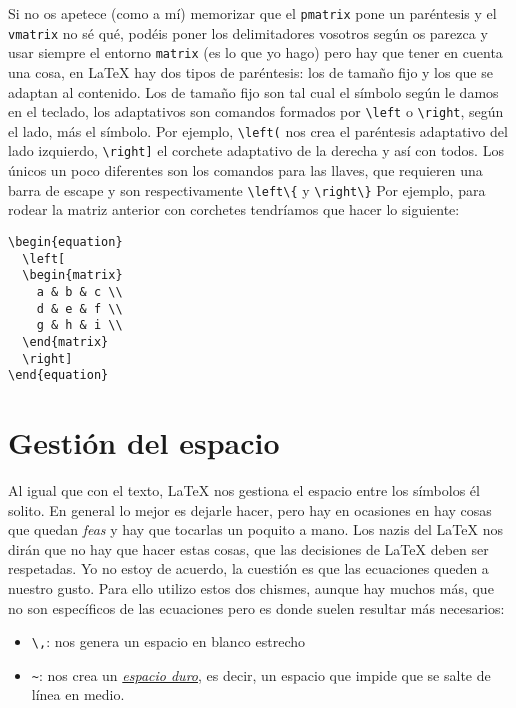 Si no os apetece (como a mí) memorizar que el \lstinline!pmatrix! pone
un paréntesis y el \lstinline!vmatrix! no sé qué, podéis poner los
delimitadores vosotros según os parezca y usar siempre el entorno
\lstinline!matrix! (es lo que yo hago) pero hay que tener en cuenta una
cosa, en LaTeX hay dos tipos de paréntesis: los de tamaño fijo y los que
se adaptan al contenido. Los de tamaño fijo son tal cual el símbolo
según le damos en el teclado, los adaptativos son comandos formados por
\lstinline!\left! o \lstinline!\right!, según el lado, más el símbolo.
Por ejemplo, \lstinline!\left(! nos crea el paréntesis adaptativo del
lado izquierdo, \lstinline!\right]! el corchete adaptativo de la derecha
y así con todos. Los únicos un poco diferentes son los comandos para las
llaves, que requieren una barra de escape y son respectivamente
\lstinline!\left\{! y \lstinline!\right\}! Por ejemplo, para rodear la
matriz anterior con corchetes tendríamos que hacer lo siguiente:

\begin{lstlisting}[language={[latex]tex}]
\begin{equation}
  \left[
  \begin{matrix}
    a & b & c \\
    d & e & f \\
    g & h & i \\
  \end{matrix}
  \right]
\end{equation}
\end{lstlisting}

\section{Gestión del espacio}\label{sec:espacio}

Al igual que con el texto, LaTeX nos gestiona el espacio entre los
símbolos él solito. En general lo mejor es dejarle hacer, pero hay en
ocasiones en hay cosas que quedan \emph{feas} y hay que tocarlas un
poquito a mano. Los nazis del LaTeX nos dirán que no hay que hacer estas
cosas, que las decisiones de LaTeX deben ser respetadas. Yo no estoy de
acuerdo, la cuestión es que las ecuaciones queden a nuestro gusto. Para
ello utilizo estos dos chismes, aunque hay muchos más, que no son
específicos de las ecuaciones pero es donde suelen resultar más
necesarios:

\begin{itemize}
\item
  \lstinline!\,!: nos genera un espacio en blanco estrecho
\item
  \lstinline!~!: nos crea un
  \href{https://es.wikipedia.org/wiki/Espacio_duro}{\emph{espacio
  duro}}, es decir, un espacio que impide que se salte de línea en
  medio.
\end{itemize}

